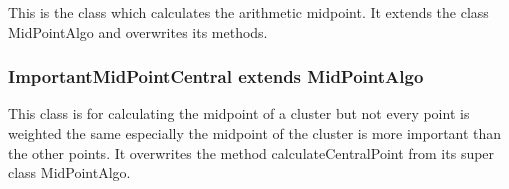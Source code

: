 	This is the class which calculates the arithmetic midpoint. It extends the class MidPointAlgo and overwrites its methods.	
	
	
	
	
	
	
	\subsubsection{ImportantMidPointCentral extends MidPointAlgo}
	
	This class is for calculating the midpoint of a cluster but not every point is weighted the same especially the midpoint of the cluster is more important than the other points. It overwrites the method calculateCentralPoint from its super class MidPointAlgo. 	
	

	
	\newpage
